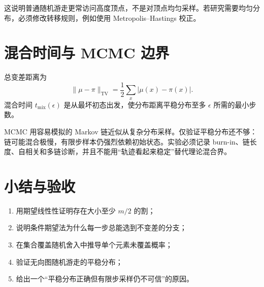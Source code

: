 这说明普通随机游走更常访问高度顶点，不是对顶点均匀采样。若研究需要均匀分布，必须修改转移规则，例如使用 Metropolis--Hastings 校正。

\section{混合时间与 MCMC 边界}

总变差距离为
\[
\|\mu-\pi\|_{\mathrm{TV}}
=\frac12\sum_x|\mu(x)-\pi(x)|.
\]
混合时间 $t_{\mathrm{mix}}(\epsilon)$ 是从最坏初态出发，使分布距离平稳分布至多 $\epsilon$ 所需的最小步数。

MCMC 用容易模拟的 Markov 链近似从复杂分布采样。仅验证平稳分布还不够：链可能混合极慢，有限步样本仍强烈依赖初始状态。实验必须记录 burn-in、链长度、自相关和多链诊断，并且不能用“轨迹看起来稳定”替代理论混合界。

\section{小结与验收}

\begin{checkpointbox}
\begin{enumerate}
  \item 用期望线性性证明存在大小至少 $m/2$ 的割；
  \item 说明条件期望法为什么每一步总能选到不变差的分支；
  \item 在集合覆盖随机舍入中推导单个元素未覆盖概率；
  \item 验证无向图随机游走的平稳分布；
  \item 给出一个“平稳分布正确但有限步采样仍不可信”的原因。
\end{enumerate}
\end{checkpointbox}
